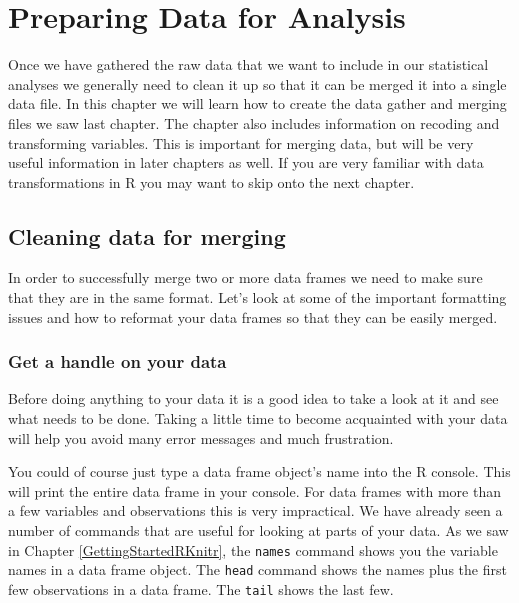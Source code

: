 



\chapter{Preparing Data for Analysis}\label{DataClean}

Once we have gathered the raw data that we want to include in our statistical analyses we generally need to clean it up so that it can be merged it into a single data file. In this chapter we will learn how to create the data gather and merging files we saw last chapter. The chapter also includes information on recoding and transforming variables. This is important for merging data, but will be very useful information in later chapters as well. If you are very familiar with data transformations in R you may want to skip onto the next chapter. 

\section{Cleaning data for merging}

In order to successfully merge two or more data frames we need to make sure that they are in the same format. Let's look at some of the important formatting issues and how to reformat your data frames so that they can be easily merged.

\subsection{Get a handle on your data}

Before doing anything to your data it is a good idea to take a look at it and see what needs to be done. Taking a little time to become acquainted with your data will help you avoid many error messages and much frustration. 

You could of course just type a data frame object's name into the R console. This will print the entire data frame in your console. For data frames with more than a few variables and observations this is very impractical. We have already seen a number of commands that are useful for looking at parts of your data. As we saw in Chapter \ref{GettingStartedRKnitr}, the \texttt{names} command shows you the variable names in a data frame object. The \texttt{head} command shows the names plus the first few observations in a data frame. The \texttt{tail} shows the last few. 

